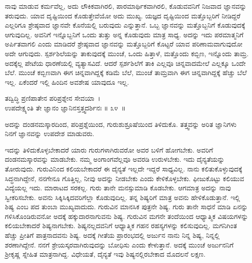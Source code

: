 ನಾವು ಮಾಡುವ ಕರ್ಮವೆಲ್ಲ, ಅದು ಲೌಕಿಕವಾಗಿರಲಿ, ಪಾರಮಾರ್ಥಿಕವಾಗಿರಲಿ, ಕೊಡುವವನಿಗೆ ನಿಜವಾದ ಜ್ಞಾನವನ್ನು ತರುವುದು. ಯಾವ ದೃಷ್ಟಿಯಿಂದ ಕೊಡುತ್ತೇವೆಯೋ ಅದು ಮುಖ್ಯ. ಯಜ್ಞದ ದೃಷ್ಟಿಯಿಂದ ಮತ್ತೊಬ್ಬರಿಗೆ ನೀಡಿದ್ದರೆ ಎಲ್ಲರಿಗೂ ಶ್ರೇಷ್ಠವಾದ ಜ್ಞಾನವೇ ಕೊನೆಯಲ್ಲಿ ಬರುವುದು ಎನ್ನುತ್ತಾನೆ. ಒಬ್ಬ ಜ್ಞಾನವನ್ನು ಮತ್ತೊಬ್ಬನಿಗೆ ಕೊಡುವುದಕ್ಕೆ ಆಗುವುದಿಲ್ಲ. ಅವನಿಗೆ ಇನ್ನೊಬ್ಬನಿಗೆ ಒಂದು ತುತ್ತು ಅನ್ನ ಕೊಡುವುದು ಮಾತ್ರ ಸಾಧ್ಯ. ಅದನ್ನು ಇದು ಪರಮಾತ್ಮನಿಗೆ ಅರ್ಪಿತವಾಗಲಿ ಎಂದು ಮಾಡಿದರೆ ಶ್ರೇಷ್ಠವಾದ ಜ್ಞಾನವನ್ನು ಮತ್ತೊಬ್ಬರಿಗೆ ಕೊಟ್ಟರೆ ಯಾವ ಪರಿಣಾಮವಾಗುವುದೋ ಅದೇ ಆಗುವುದು. ಸ್ಪರ್ಶಶಿಲೆಯನ್ನು ತಾಕುವುದಕ್ಕೆ ಮುಂಚೆ, ಒಂದು ಹಿತ್ತಾಳೆ, ಮತ್ತೊಂದು ಕಬ್ಬಿಣ, ಇನ್ನೊಂದು ತಾಮ್ರ. ಅದಕ್ಕೆಲ್ಲ ಪೇಟೆಯ ಧಾರಣೆಯಲ್ಲಿ ವ್ಯತ್ಯಾಸವಿದೆ. ಆದರೆ ಸ್ಪರ್ಶಶಿಲೆಗೆ ತಾಕಿ ಎಲ್ಲವೂ ಚಿನ್ನವಾದಮೇಲೆ ಎಲ್ಲಕ್ಕೂ ಒಂದೇ ಬೆಲೆ. ಮುಂಚೆ ಕಬ್ಬಿಣವಾಗಿ ಈಗ ಚಿನ್ನವಾಗಿದ್ದಕ್ಕೆ ಕಡಿಮೆ ಬೆಲೆ, ಮುಂಚೆ ತಾಮ್ರವಾಗಿ ಈಗ ಚಿನ್ನವಾಗಿದ್ದಕ್ಕೆ ಹೆಚ್ಚು ಬೆಲೆ ಇಲ್ಲ. ಏಕೆಂದರೆ ಇಲ್ಲಿ ಹಿಂದಿನ ಅವಶೇಷ ಯಾವುದೂ ಇಲ್ಲ.

\begin{shloka}
ತದ್ವಿದ್ಧಿ ಪ್ರಣಿಪಾತೇನ ಪರಿಪ್ರಶ್ನೇನ ಸೇವಯಾ~।\\ಉಪದೇಕ್ಷ್ಯಂತಿ ತೇ ಜ್ಞಾನಂ ಜ್ಞಾನಿನಸ್ತತ್ತ್ವದರ್ಶಿನಃ \hfill॥ ೩೪~॥
\end{shloka}

\begin{artha}
ಅದನ್ನು ದಂಡನಮಸ್ಕಾರದಿಂದ, ಪರಿಪ್ರಶ್ನೆಯಿಂದ, ಗುರುಶುಶ್ರೂಷೆಯಿಂದ ತಿಳಿದುಕೊ. ತತ್ತ್ವವನ್ನು ಅರಿತ ಜ್ಞಾನಿಗಳು ನಿನಗೆ ಜ್ಞಾನವನ್ನು ಉಪದೇಶ ಮಾಡುವರು.
\end{artha}

ಇದನ್ನು ತಿಳಿದುಕೊಳ್ಳಬೇಕಾದರೆ ಯಾರು ಗುರುಗಳಾಗಿರುವರೋ ಅವರ ಬಳಿಗೆ ಹೋಗಬೇಕು. ಅವರಿಗೆ ದಂಡನಮಸ್ಕಾರವನ್ನು ಮಾಡಬೇಕು. ನಮ್ಮ ಅಂಗಾಂಗವೆಲ್ಲವೂ ಅವರಡಿ ಉರುಳಬೇಕು. ಇದು ದೈನ್ಯತೆಯನ್ನು ತೋರುವುದು. ಗುರುವಿನಿಂದ ಕಲಿಯಬೇಕಾದರೆ ಈ ದೈನ್ಯತೆ ಇಲ್ಲದೇ ಇದ್ದರೆ ಸಾಧ್ಯವಿಲ್ಲ. ನಾನು ಕಲಿತುಕೊಳ್ಳುವುದಕ್ಕೆ ಸಿದ್ಧನಾಗಿದ್ದೇನೆ, ನನಗೇನೂ ಗೊತ್ತಿಲ್ಲ, ನೀವು ಅದನ್ನು ನೀಡಬೇಕು ಎಂದು ಕೇಳಿಕೊಳ್ಳಬೇಕು. ಫೀಜುಕೊಟ್ಟು ಕಲಿಯುವ ವಿದ್ಯೆಯಲ್ಲ ಇದು. ಮಾರಾಟದ ಸರಕಲ್ಲ. ಗುರು ತಾನೇ ಮನಸ್ಸುಮಾಡಿ ಕೊಡಬೇಕು. ಆಗಮಾತ್ರ ಅದನ್ನು ನಾವು ಸ್ವೀಕರಿಸಬೇಕು. ಅವನು ಸಿಕ್ಕಿಸಿಕ್ಕಿದವರಿಗೆಲ್ಲಾ ಕೊಡುವುದಿಲ್ಲ. ತನ್ನ ಶಿಷ್ಯರಿಗೆ ಮಾತ್ರ ಅವನು ಹೇಳಿಕೊಡುತ್ತಾನೆ. ಇಲ್ಲಿ ಶಿಷ್ಯ ಎಂಬ ಪದ ತುಂಬಾ ಮುಖ್ಯವಾದುದು. ಗುರುವಿನ ಮಾನಸಿಕ ಪುತ್ರನೇ ಶಿಷ್ಯ. ಗುರು ತಾನೇ ಸಾಧನೆ ಮಾಡಿ ಏನನ್ನು ಗಳಿಸಿಕೊಂಡಿರುವನೋ ಅದಕ್ಕೆ ಹಕ್ಕುದಾರನಾಗುವನು ಶಿಷ್ಯ. ಗುರುವಿನ ಮಗನೇ ತಂದೆಯಿಂದ ಆಧ್ಯಾತ್ಮಿಕ ವಿಷಯಗಳನ್ನು ಕಲಿಯಬೇಕಾದರೆ ಶಿಷ್ಯನಾಗಬೇಕು. ಶಿಷ್ಯನಲ್ಲದವನಿಗೆ ಆಧ್ಯಾತ್ಮಿಕ ಗಹನ ರಹಸ್ಯಗಳನ್ನು ಕಲಿಸುವುದಿಲ್ಲ. ಮಗನಿಗಿಂತ ಹೆಚ್ಚು ಪ್ರೀತಿಗೆ ಪಾತ್ರನಾದವನು ಶಿಷ್ಯ. ಅದಕ್ಕೆ ಗೀತೆಯ ಪ್ರಾರಂಭದಲ್ಲಿ ಅರ್ಜುನ ನಾನು ನಿನ್ನ ಶಿಷ್ಯ, ನಿನ್ನಲ್ಲಿ ಶರಣಾಗಿದ್ದೇನೆ. ನನಗೆ ಶ್ರೇಯಸ್ಕರವಾಗಿರುವುದನ್ನು ಬೋಧಿಸು ಎಂದು ಕೇಳುತ್ತಾನೆ. ಅದಕ್ಕೆ ಮುಂಚೆ ಅರ್ಜುನನಿಗೆ ಶ‍್ರೀಕೃಷ್ಣ ಸ್ನೇಹಿತ ಮಾತ್ರನಾಗಿದ್ದ. ವಿಧೇಯತೆ, ದೈನ್ಯತೆ ಇವು ಶಿಷ್ಯನಲ್ಲಿರಬೇಕಾದ ಮೊದಲನೆ ಲಕ್ಷಣ.

